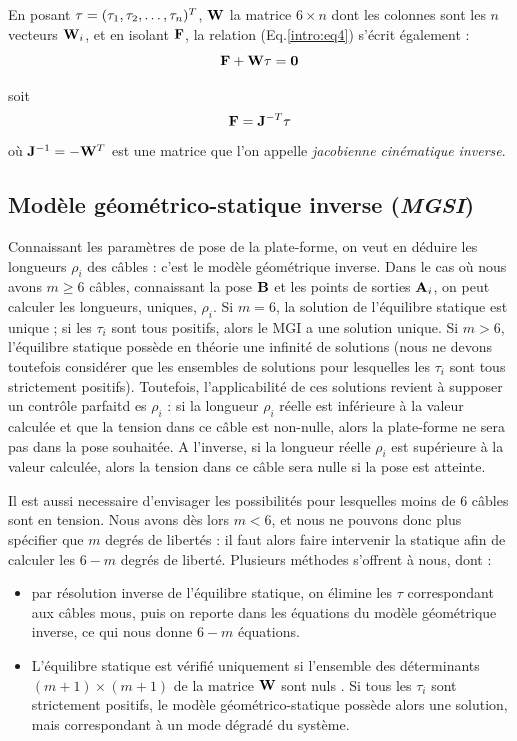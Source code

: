 En posant ${\bf \tau} = (\tau_1, \tau_2, \dots, \tau_n)^T$, ${\bf W}$ la 
matrice $6 \times n$ dont les colonnes sont les $n$ vecteurs ${\bf W}_i$, et 
en isolant $\mathcal {\bf F}$, la relation (Eq.\ref{intro:eq4}) s'écrit 
également :
\begin{equation}
\mathcal {\bf F} + {\bf W} \tau = {\bf 0}
\label{intro:eq5a}
\end{equation}

soit  
\begin{equation}
\mathcal {\bf F} = {\bf J}^{-T} {\bf \tau}
\label{intro:eq5b}
\end{equation}
où ${\bf J}^{-1} = - {\bf W}^T$ est une matrice que l'on appelle {\it 
jacobienne cin\'ematique inverse}.

\subsection{Modèle géométrico-statique inverse ({\it MGSI})} 
\label{chap0-1-3}

Connaissant les paramètres de pose de la plate-forme, on veut en déduire les 
longueurs $\rho_i$ des câbles : c'est le modèle géométrique inverse. 
Dans le cas où nous avons $m \geq 6$ câbles, connaissant la pose ${\bf B}$ et 
les points de sorties ${\bf A}_i$, on peut calculer les longueurs, uniques, 
$\rho_i$. Si $m = 6$, la solution de l'équilibre statique est unique ; si les 
$\tau_i$ sont tous positifs, alors le MGI a une solution unique. 
Si $m > 6$, l'\'equilibre statique possède en théorie une infinité de solutions 
(nous ne devons toutefois consid\'erer que les ensembles de solutions pour 
lesquelles les $\tau_i$ sont tous strictement positifs). Toutefois, 
l'applicabilit\'e de ces solutions revient \`a supposer un contr\^ole parfaitd 
es $\rho_i$ : si la longueur $\rho_i$ r\'eelle est inf\'erieure \`a la valeur 
calcul\'ee et que la tension dans ce c\^able est non-nulle, alors la 
plate-forme ne sera pas dans la pose souhait\'ee. A l'inverse, si la 
longueur r\'eelle $\rho_i$ est sup\'erieure \`a la valeur calcul\'ee, alors la 
tension dans ce c\^able sera nulle si la pose est atteinte.

Il est aussi necessaire d'envisager les possibilit\'es pour lesquelles moins de 
$6$ c\^ables sont en tension. Nous avons d\`es lors $m < 6$, et nous ne pouvons 
donc plus sp\'ecifier que $m$ degr\'es de libert\'es : il faut alors faire 
intervenir la statique afin de calculer les $6-m$ degr\'es de libert\'e. 
Plusieurs m\'ethodes s'offrent \`a nous, dont :
\begin{itemize}
 \item par r\'esolution inverse de l'\'equilibre statique, on \'elimine les 
$\tau$ correspondant aux c\^ables mous, puis on reporte dans les \'equations du 
mod\`ele g\'eom\'etrique inverse, ce qui nous donne $6-m$ \'equations.
\item L'équilibre statique est vérifié 
uniquement si l'ensemble des déterminants $(m+1) \times (m+1)$ de la matrice 
${\bf W}$ sont nuls \cite{carricato_merlet2013}. Si tous les $\tau_i$ sont 
strictement positifs, le modèle géométrico-statique possède alors une solution, 
mais correspondant à un mode dégradé du système.
\end{itemize}


